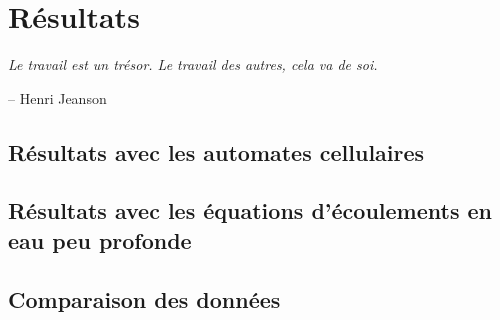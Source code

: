 \chapter{Résultats}
\label{chap:four}

\epigraph{\itshape Le travail est un trésor. Le travail des autres, cela va de soi.}{-- Henri Jeanson}

\stopcontents[chapters]
\startcontents[chapters]

\printMyMinitoc

\fancyhead[LE]{\textsc{\chaptername~\thechapter}}


\section{Résultats avec les automates cellulaires}
\label{sec:four:one}

\section{Résultats avec les équations d'écoulements en eau peu profonde}
\label{sec:four:two}

\section{Comparaison des données}
\label{sec:four:three}
